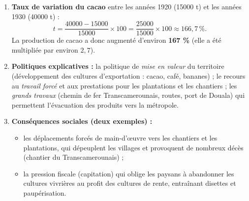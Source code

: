 \documentclass[11pt]{article}
\begin{document}
\begin{corrige}
\begin{enumerate}
\item \textbf{Taux de variation du cacao} entre les années 1920 (\num{15000} t) et les années 1930 (\num{40000} t) :
\[ t = \frac{\num{40000} - \num{15000}}{\num{15000}} \times 100 = \frac{\num{25000}}{\num{15000}} \times 100 \approx 166{,}7\,\%. \]
La production de cacao a donc augmenté d'environ \textbf{167 \%} (elle a été multipliée par environ $2{,}7$).
\item \textbf{Politiques explicatives :} la politique de \emph{mise en valeur} du territoire (développement des cultures d'exportation : cacao, café, bananes) ; le recours au \emph{travail forcé} et aux prestations pour les plantations et les chantiers ; les \emph{grands travaux} (chemin de fer Transcamerounais, routes, port de Douala) qui permettent l'évacuation des produits vers la métropole.
\item \textbf{Conséquences sociales (deux exemples) :}
\begin{itemize}
\item les déplacements forcés de main-d'œuvre vers les chantiers et les plantations, qui dépeuplent les villages et provoquent de nombreux décès (chantier du Transcamerounais) ;
\item la pression fiscale (capitation) qui oblige les paysans à abandonner les cultures vivrières au profit des cultures de rente, entraînant disettes et paupérisation.
\end{itemize}
\end{enumerate}
\end{corrige}
\end{document}
